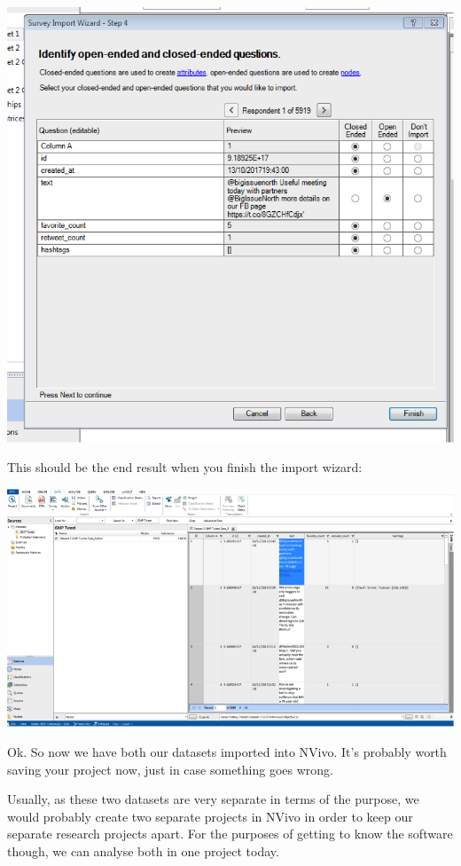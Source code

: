 \documentclass[]{book}
\theoremstyle{definition}
\theoremstyle{definition}
\theoremstyle{definition}
\theoremstyle{remark}
\begin{document}
\includegraphics{imgs/qual_37.png}

This should be the end result when you finish the import wizard:

\includegraphics{imgs/qual_38.png}

Ok. So now we have both our datasets imported into NVivo. It's probably
worth saving your project now, just in case something goes wrong.

Usually, as these two datasets are very separate in terms of the
purpose, we would probably create two separate projects in NVivo in
order to keep our separate research projects apart. For the purposes of
getting to know the software though, we can analyse both in one project
today.
\end{document}
